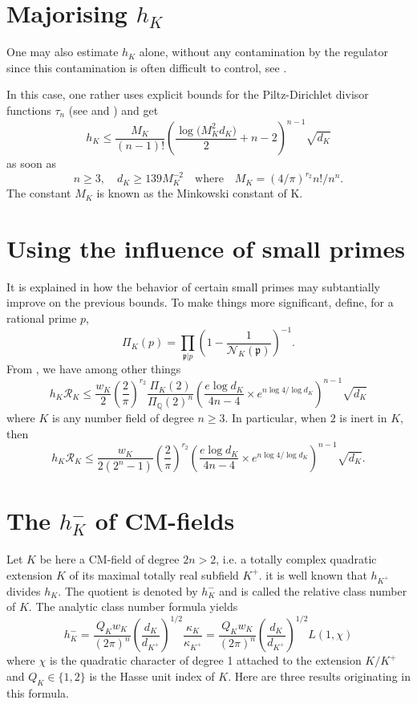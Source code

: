 \section{Majorising $h_K$
}



One may also estimate $h_K$ alone, without any contamination by the regulator
since this contamination is often difficult to control,
see \cite{Pohst-Zassenhaus*89}.

In this case, one
rather uses explicit bounds for the Piltz-Dirichlet divisor functions $\tau_n$
(see \cite{Bordelles*02}
and \cite{Bordelles*06})
and get
$$
h_K\le \frac{M_K}{(n-1)!}
\left(\frac{\log\bigl(M^2_Kd_K\bigr)}{2}+n-2\right)^{n-1}
\sqrt{d_K}
$$
as soon as
$$
n\ge 3,\quad d_K\ge 139 M_K^{-2}
\quad\text{where}\quad
M_K=(4/\pi)^{r_2}n!/n^n.
$$
The constant $M_K$ is known as the Minkowski constant of K.



\section{Using the influence of small primes
}



It is explained in
\cite{Louboutin*05} how the
behavior of certain small primes may subtantially improve on the previous
bounds. To make things more significant, define, for a rational prime $p$,
$$
\Pi_K(p)=\prod_{\mathfrak{p}|p}\left(1-\frac{1}{\mathcal{N}_K(\mathfrak{p})}\right)^{-1}.
$$
From \cite{Louboutin*05}, we have
among other things
$$
h_K\mathcal{R}_K
\le\frac{w_K}{2}
\left(\frac{2}{\pi}\right)^{r_2}
\frac{\Pi_K(2)}{\Pi_{\mathbb{Q}}(2)^n}
\left(\frac{e\log d_K}{4n-4}\times
e^{n\log 4/\log d_K}
\right)^{n-1}\sqrt{d_K}
$$
where $K$ is any number field of degree $n\ge3$. In particular, when $2$ is
inert in $K$, then
$$
h_K\mathcal{R}_K
\le\frac{w_K}{2(2^n-1)}
\left(\frac{2}{\pi}\right)^{r_2}
\left(\frac{e\log d_K}{4n-4}\times
e^{n\log 4/\log d_K}
\right)^{n-1}\sqrt{d_K}.
$$




\section{The $h^-_K$ of CM-fields
}



Let $K$ be here a CM-field of degree $2n > 2$, i.e. a totally complex
quadratic extension $K$ of its maximal totally real subfield $K^+$. it is well
known that $h_{K^+}$ divides $h_K$. The quotient is denoted by $h^-_K$ and is
called the relative class number of $K$. The analytic class number
formula yields
$$
h^-_K=\frac{Q_Kw_K}{(2\pi)^n}
\left(\frac{d_K}{d_{K^+}}\right)^{1/2}
\frac{\kappa_K}{\kappa_{K^+}}
=
\frac{Q_Kw_K}{(2\pi)^n}
\left(\frac{d_K}{d_{K^+}}\right)^{1/2}
L(1,\chi)
$$
where $\chi$ is the quadratic character of degree 1 attached to the extension
$K/K^+$ and $Q_K\in\{1,2\}$ is the Hasse unit index of $K$.
Here are three results originating in this formula.

